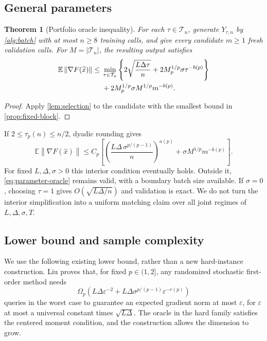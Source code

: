 \documentclass[11pt,a4paper]{article}
\newcommand{\E}{\mathbb{E}}
\newcommand{\eps}{\varepsilon}
\newcommand{\cT}{\mathcal{T}}
\newcommand{\norm}[1]{\left\lVert #1\right\rVert}
\newtheorem{theorem}{Theorem}[section]
\theoremstyle{definition}
\theoremstyle{remark}
\begin{document}
\subsection{General parameters}\label{sec:general-parameters}

\begin{theorem}[Portfolio oracle inequality]\label{thm:parameter-oracle}
For each $\tau\in\cT_n$, generate $Y_{\tau,n}$ by
\cref{alg:batch} with at most $n\ge8$ training calls, and give every
candidate $m\ge1$ fresh validation calls.
For $M=|\cT_n|$, the resulting output satisfies
\begin{align}
 \E\norm{\nabla F(\widehat x)}
 \le {}&\min_{\tau\in\cT_n}
 \left\{2\sqrt{\frac{L\Delta\tau}{n}}
       +2M_p^{1/p}\sigma\tau^{-b(p)}\right\}\notag\\
 &+2M_p^{1/p}\sigma M^{1/p}m^{-b(p)}.
 \label{eq:parameter-oracle}
\end{align}
\end{theorem}
\begin{proof}
Apply \cref{lem:selection} to the candidate with the smallest bound
in \cref{prop:fixed-block}.
\end{proof}

If $2\le\tau_p(n)\le n/2$, dyadic rounding gives
\begin{equation}\label{eq:general-interior}
 \E\norm{\nabla F(\widehat x)}
 \le C_p\left[
 \left(\frac{L\Delta\,\sigma^{p/(p-1)}}{n}\right)^{a(p)}
 +\sigma M^{1/p}m^{-b(p)}\right].
\end{equation}
For fixed $L,\Delta,\sigma>0$ this interior condition eventually holds.
Outside it, \eqref{eq:parameter-oracle} remains valid, with a boundary
batch size available. If $\sigma=0$, choosing $\tau=1$ gives
$O(\sqrt{L\Delta/n})$ and validation is exact.
We do not turn the interior simplification into a uniform matching claim
over all joint regimes of $L,\Delta,\sigma,T$.

\subsection{Lower bound and sample complexity}\label{sec:lower}

We use the following existing lower bound, rather than a new hard-instance
construction. Liu \cite[Theorem~11]{liu2026oco} proves that, for
fixed $p\in(1,2]$, any randomized stochastic first-order method needs
\begin{equation}\label{eq:liu-lower}
 \Omega_p\left(L\Delta\eps^{-2}
       +L\Delta\sigma^{p/(p-1)}\eps^{-r(p)}\right)
\end{equation}
queries in the worst case to guarantee an expected gradient norm at most
$\eps$, for $\eps$ at most a universal constant times
$\sqrt{L\Delta}$. The oracle in the hard family satisfies the centered
moment condition, and the construction allows the dimension to grow.
\end{document}
